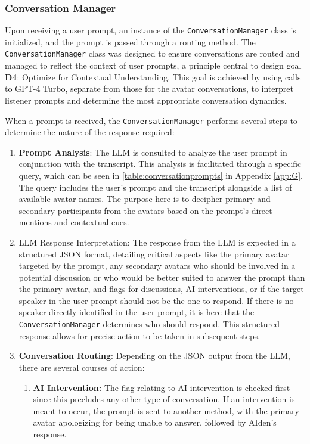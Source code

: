 \documentclass[12pt]{report}
\begin{document}
\begin{myfont}
        \subsubsection{Conversation Manager}
        \indent Upon receiving a user prompt, an instance of the \texttt{ConversationManager} class is initialized, and the prompt is passed through a routing method. The \texttt{ConversationManager} class was designed to ensure conversations are routed and managed to reflect the context of user prompts, a principle central to design goal \textbf{D4}: Optimize for Contextual Understanding. This goal is achieved by using calls to GPT-4 Turbo, separate from those for the avatar conversations, to interpret listener prompts and determine the most appropriate conversation dynamics.
        
        \indent When a prompt is received, the \texttt{ConversationManager} performs several steps to determine the nature of the response required: 
        \begin{enumerate}
            \item \textbf{Prompt Analysis}: The LLM is consulted to analyze the user prompt in conjunction with the transcript. This analysis is facilitated through a specific query, which can be seen in \ref{table:conversationprompts} in Appendix \ref{app:G}. The query includes the user's prompt and the transcript alongside a list of available avatar names. The purpose here is to decipher primary and secondary participants from the avatars based on the prompt's direct mentions and contextual cues.
            \item{LLM Response Interpretation}: The response from the LLM is expected in a structured JSON format, detailing critical aspects like the primary avatar targeted by the prompt, any secondary avatars who should be involved in a potential discussion or who would be better suited to answer the prompt than the primary avatar, and flags for discussions, AI interventions, or if the target speaker in the user prompt should not be the one to respond. If there is no speaker directly identified in the user prompt, it is here that the \texttt{ConversationManager} determines who should respond. This structured response allows for precise action to be taken in subsequent steps.
            \item \textbf{Conversation Routing}: Depending on the JSON output from the LLM, there are several courses of action:
            \begin{enumerate}
                \item \textbf{AI Intervention:} The flag relating to AI intervention is checked first since this precludes any other type of conversation. If an intervention is meant to occur, the prompt is sent to another method, with the primary avatar apologizing for being unable to answer, followed by AIden's response.

\end{enumerate}
\end{enumerate}
\end{myfont}
\end{document}
